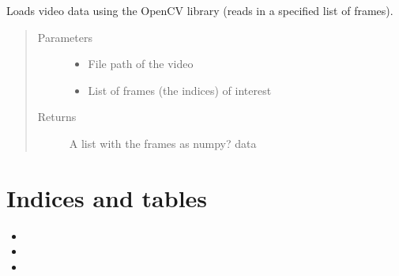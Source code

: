 \documentclass[letterpaper,10pt,english]{sphinxmanual}
\begin{document}

\begin{fulllineitems}
\label{\detokenize{index:mlpy.mio.read_frames}}
Loads video data using the OpenCV library (reads in a specified list of frames).
\begin{quote}\begin{description}
\item[{Parameters}] \leavevmode\begin{itemize}
\item {} 
 \textendash{} File path of the video

\item {} 
 \textendash{} List of frames (the indices) of interest

\end{itemize}

\item[{Returns}] \leavevmode
A list with the frames as numpy? data

\end{description}\end{quote}

\end{fulllineitems}



\chapter{Indices and tables}
\label{\detokenize{index:indices-and-tables}}\begin{itemize}
\item {} 

\item {} 

\item {} 

\end{itemize}
\end{document}
